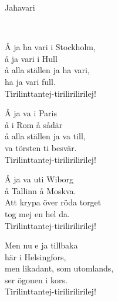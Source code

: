 \begin{song}{Jahavari}
	
	
	\\

    \showversenumber	
	Å ja ha vari i Stockholm,\\
	å ja vari i Hull\\
	å alla ställen ja ha vari,\\
	ha ja vari full.\\
	Tirilinttantej-tirilirilirilej!
	
    \showversenumber
	Å ja va i Paris\\
	å i Rom å sådär\\
	å alla ställen ja va till,\\
	va törsten ti besvär.\\
	Tirilinttantej-tirilirilirilej!
	
    \showversenumber
	Å ja va uti Wiborg\\
	å Tallinn å Moskva.\\
	Att krypa över röda torget\\
	tog mej en hel da.\\
	Tirilinttantej-tirilirilirilej!
	
    \showversenumber
	Men nu e ja tillbaka\\
	här i Helsingfors,\\
	men likadant, som utomlands,\\
	ser ögonen i kors.\\
	Tirilinttantej-tirilirilirilej!
	
\end{song}
